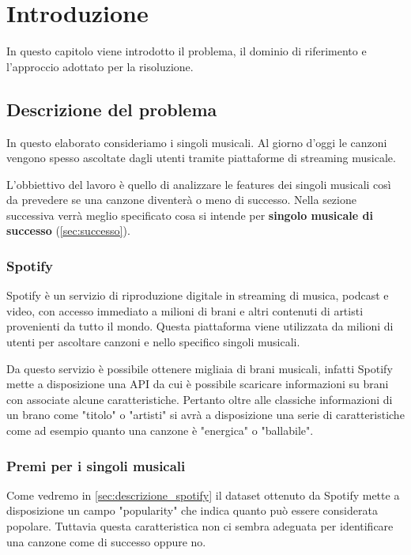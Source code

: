 \chapter{Introduzione}

In questo capitolo viene introdotto il problema, il dominio di
riferimento e l'approccio adottato per la risoluzione.

\section{Descrizione del problema}
In questo elaborato consideriamo i singoli musicali. Al giorno d'oggi
le canzoni vengono spesso ascoltate dagli utenti tramite piattaforme di
streaming musicale.

L'obbiettivo del lavoro è quello di analizzare le features dei singoli
musicali così da prevedere se una canzone diventerà o meno di
successo. Nella sezione successiva verrà meglio specificato cosa si
intende per \textbf{singolo musicale di successo}
(\autoref{sec:successo}).

\subsection{Spotify}
Spotify è un servizio di riproduzione digitale in streaming di musica,
podcast e video, con accesso immediato a milioni di brani e altri
contenuti di artisti provenienti da tutto il mondo. Questa piattaforma
viene utilizzata da milioni di utenti per ascoltare canzoni e nello
specifico singoli musicali.

Da questo servizio è possibile ottenere migliaia di brani musicali,
infatti Spotify mette a disposizione una API da cui è possibile
scaricare informazioni su brani con associate alcune
caratteristiche. Pertanto oltre alle classiche informazioni di un
brano come "titolo" o "artisti" si avrà a disposizione una serie di
caratteristiche come ad esempio quanto una canzone è "energica" o
"ballabile".


\subsection{Premi per i singoli musicali}
\label{sec:successo}

Come vedremo in \autoref{sec:descrizione_spotify} il dataset ottenuto
da Spotify mette a disposizione un campo "popularity" che indica
quanto può essere considerata popolare. Tuttavia questa caratteristica
non ci sembra adeguata per identificare una canzone come di successo
oppure no.


